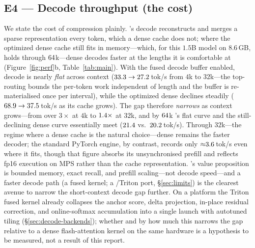 \subsection{E4 --- Decode throughput (the cost)}
We state the cost of compression plainly. \dkv{}'s decode reconstructs and merges a sparse
representation every token, which a dense cache does not; where the optimized dense cache still fits
in memory---which, for this $1.5$B model on $8.6$\,GB, holds through $64$k---dense decodes
faster at the lengths it is comfortable at (Figure~\ref{fig:perf}b, Table~\ref{tab:main}). With the
fused decode buffer enabled, \dkv{} decode is nearly \emph{flat} across context
($33.3\to27.2$\,tok/s from $4$k to $32$k---the top-\topk{} routing bounds the
per-token work independent of length and the buffer is re-materialised once per interval), while the
optimized dense declines steadily ($68.9\to37.5$\,tok/s as its cache grows). The
gap therefore \emph{narrows} as context grows---from over $3\times$ at $4$k to
$1.4\times$ at $32$k, and by $64$k \dkv{}'s flat curve and the
still-declining dense curve essentially meet ($21.4$ vs.\ $20.2$\,tok/s).
Through $32$k---the regime where a dense cache is the natural choice---dense remains the faster
decoder; the standard PyTorch engine, by contrast, records only ${\approx}3.6$\,tok/s even where
it fits, though that figure absorbs its unsynchronised prefill and reflects fp16 execution on MPS
rather than the cache representation. \dkv{}'s value proposition
is bounded memory, exact recall, and prefill scaling---not decode speed---and a faster decode path
(a fused kernel; a \cuda{}/Triton port, \S\ref{sec:limits}) is the clearest avenue to narrow the
short-context decode gap further. On a \cuda{} platform the Triton fused kernel already collapses
the anchor score, delta projection, in-place residual correction, and online-softmax accumulation
into a single launch with autotuned tiling (\S\ref{sec:decode-backends}); whether and by how much
this narrows the gap relative to a dense flash-attention kernel on the same hardware is a
hypothesis to be measured, not a result of this report.



